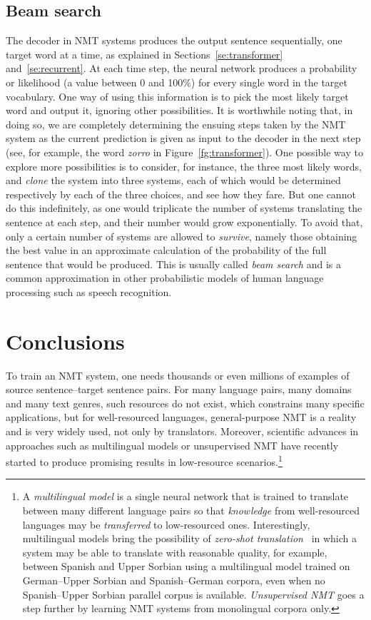\documentclass[output=paper,colorlinks,citecolor=brown]{langscibook}
\begin{document}
\subsection{Beam search}
\label{se:beam}

The decoder in NMT systems produces the output sentence sequentially, one target word at a time, as explained in Sections~\ref{se:transformer} and~\ref{se:recurrent}. 
At each time step, the neural network produces a probability or likelihood (a value between 0 and 100\%) for every single word in the target vocabulary. One way of using this information is to pick the most likely target word and output it, ignoring other possibilities. It is worthwhile noting that, in doing so, we are completely determining the ensuing steps taken by the NMT system as the current prediction is given as input to the decoder in the next step (see, for example, the word \emph{zorro} in Figure~\ref{fg:transformer}). One possible way to explore more possibilities is to consider, for instance, the three most likely words, and \emph{clone} the system into three systems, each of which would be determined respectively by each of the three choices, and see how they fare. But one cannot do this indefinitely, as one would triplicate the number of systems translating the sentence at each step, and their number would grow exponentially. To avoid that, only a certain number of systems are allowed to \emph{survive}, namely those obtaining the best value in an approximate calculation of the probability of the full sentence that would be produced. This is usually called \emph{beam search} and is a common approximation in other probabilistic models of human language processing such as speech recognition. 


\section{Conclusions}

To train an NMT system, one needs thousands or even millions of examples of source sentence--target sentence pairs. For many language pairs, many domains and many text genres, such resources do not exist, which constrains many specific applications, but for well-resourced languages, general-purpose NMT is a reality and is very widely used, not only by translators. Moreover, scientific advances in approaches such as multilingual models or unsupervised NMT have recently started to produce promising results in low-resource scenarios.\footnote{A \emph{multilingual model} is a single neural network that is trained to translate between many different language pairs so that \emph{knowledge} from well-resourced languages may be \emph{transferred} to low-resourced ones. Interestingly, multilingual models bring the possibility of \emph{zero-shot translation}~\citep{zero2021} in which a system may be able to translate with reasonable quality, for example, between Spanish and Upper Sorbian using a multilingual model trained on German--Upper Sorbian and Spanish--German corpora, even when no Spanish--Upper Sorbian parallel corpus is available. \emph{Unsupervised NMT} goes a step further by learning NMT systems from monolingual corpora only.}
\end{document}
